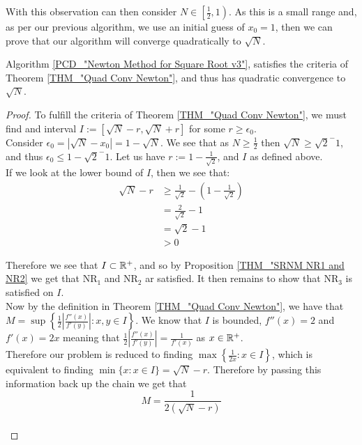 With this observation can then consider \(N \in \left[\tfrac{1}{2}, 1\right)\). As this is a small range and, as per our previous algorithm, we use an initial guess of \(x_0 = 1\), then we can prove that our algorithm will converge quadratically to \(\sqrt{N}\).

\begin{SRNM NR3 for v3}
\label{THM_"NR3 for v3"}
Algorithm \ref{PCD_"Newton Method for Square Root v3"}, satisfies the criteria of Theorem \ref{THM_"Quad Conv Newton"}, and thus has quadratic convergence to \(\sqrt{N}\).
\end{SRNM NR3 for v3}
\begin{proof}
To fulfill the criteria of Theorem \ref{THM_"Quad Conv Newton"}, we must find and interval \(I := [\sqrt{N}-r, \sqrt{N} + r]\) for some \(r \ge \epsilon_0\).\\

Consider \(\epsilon_0 = |\sqrt{N} - x_0| = 1 - \sqrt{N}\). We see that as \(N \ge \frac{1}{2}\) then \(\sqrt{N} \ge \sqrt{2}^-1\), and thus \(\epsilon_0 \le 1 - \sqrt{2}^-1\). Let us have \(r := 1 - \frac{1}{\sqrt{2}}\), and \(I\) as defined above.\\

If we look at the lower bound of \(I\), then we see that:
\begin{displaymath}
\begin{align*}
\sqrt{N} - r &\ge \frac{1}{\sqrt{2}} - (1 - \frac{1}{\sqrt{2}})\\
	&= \frac{2}{\sqrt{2}} - 1\\
	&= \sqrt{2} - 1 \\
	&> 0
\end{align*}
\end{displaymath}

Therefore we see that \(I \subset \mathbb{R}^+\), and so by Proposition \ref{THM_"SRNM NR1 and NR2} we get that \(\mathrm{NR}_1\) and \(\mathrm{NR}_2\) ar satisfied. It then remains to show that \(\mathrm{NR}_3\) is satisfied on \(I\).\\

Now by the definition in Theorem \ref{THM_"Quad Conv Newton"}, we have that \(M = \sup\left\{\frac{1}{2}\left|\frac{f''(x)}{f'(y)}\right| : x, y \in I\right\}\). We know that \(I\) is bounded, \(f''(x) = 2\) and \(f'(x) = 2x\) meaning that \(\frac{1}{2}\left|\frac{f''(x)}{f'(y)}\right| = \frac{1}{f'(x)}\) as \(x \in \mathbb{R}^+\).\\ 

Therefore our problem is reduced to finding \(\max\left\{\frac{1}{2x} : x \in I\right\}\), which is equivalent to finding \(\min\{x : x \in I\} = \sqrt{N} - r\). Therefore by passing this information back up the chain we get that \[M = \frac{1}{2(\sqrt{N} - r)}\]\\


\end{proof}
